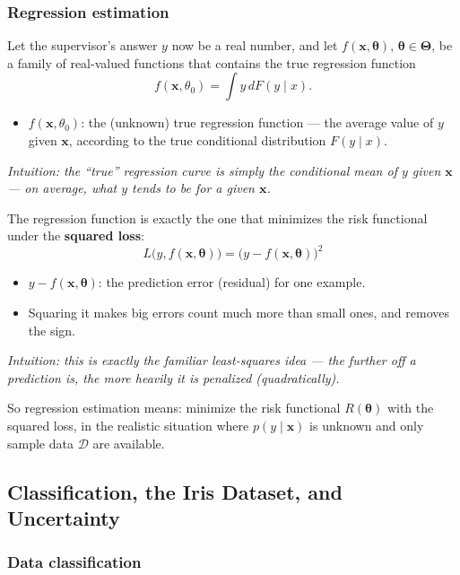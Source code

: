 \subsubsection{Regression estimation}

Let the supervisor's answer $y$ now be a real number, and let $f(\mathbf{x}, \boldsymbol\theta)$, $\boldsymbol\theta \in \boldsymbol\Theta$, be a family of real-valued functions that contains the true regression function
\[
  f(\mathbf{x}, \theta_0) = \int y \, dF(y \mid x).
\]
\begin{itemize}
  \item $f(\mathbf{x}, \theta_0)$: the (unknown) true regression function — the average value of $y$ given $\mathbf{x}$, according to the true conditional distribution $F(y\mid x)$.
\end{itemize}
\textit{Intuition: the ``true'' regression curve is simply the conditional mean of $y$ given $\mathbf{x}$ — on average, what $y$ tends to be for a given $\mathbf{x}$.}

The regression function is exactly the one that minimizes the risk functional under the \textbf{squared loss}:
\[
  L\bigl(y, f(\mathbf{x}, \boldsymbol\theta)\bigr) = \bigl(y - f(\mathbf{x}, \boldsymbol\theta)\bigr)^2
\]
\begin{itemize}
  \item $y - f(\mathbf{x}, \boldsymbol\theta)$: the prediction error (residual) for one example.
  \item Squaring it makes big errors count much more than small ones, and removes the sign.
\end{itemize}
\textit{Intuition: this is exactly the familiar least-squares idea — the further off a prediction is, the more heavily it is penalized (quadratically).}

So regression estimation means: minimize the risk functional $R(\boldsymbol\theta)$ with the squared loss, in the realistic situation where $p(y\mid \mathbf{x})$ is unknown and only sample data $\mathcal{D}$ are available.

\subsection{Classification, the Iris Dataset, and Uncertainty}\label{sec:rl-prolusion-classification}

\subsubsection{Data classification}

